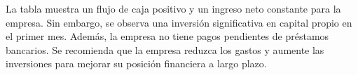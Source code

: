 La tabla muestra un flujo de caja positivo y un ingreso neto constante para la empresa. Sin embargo, se observa una inversión significativa en capital propio en el primer mes. Además, la empresa no tiene pagos pendientes de préstamos bancarios. Se recomienda que la empresa reduzca los gastos y aumente las inversiones para mejorar su posición financiera a largo plazo.